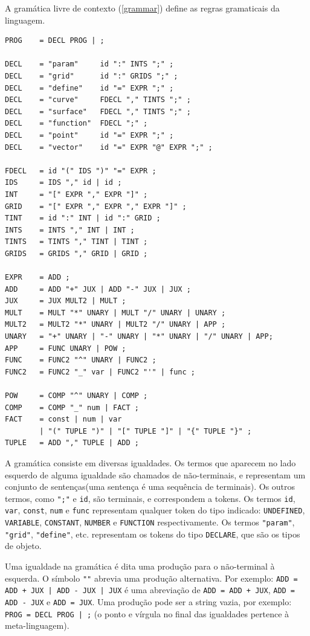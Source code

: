 \newpage
A gramática livre de contexto (\ref{grammar}) define as
regras gramaticais da linguagem.
\begin{lstlisting}[caption=Gramática livre de contexto, label=grammar]
PROG    = DECL PROG | ;

DECL    = "param"     id ":" INTS ";" ;
DECL    = "grid"      id ":" GRIDS ";" ;
DECL    = "define"    id "=" EXPR ";" ;
DECL    = "curve"     FDECL "," TINTS ";" ;
DECL    = "surface"   FDECL "," TINTS ";" ;
DECL    = "function"  FDECL ";" ;
DECL    = "point"     id "=" EXPR ";" ;
DECL    = "vector"    id "=" EXPR "@" EXPR ";" ;

FDECL   = id "(" IDS ")" "=" EXPR ;
IDS     = IDS "," id | id ;
INT     = "[" EXPR "," EXPR "]" ;
GRID    = "[" EXPR "," EXPR "," EXPR "]" ;
TINT    = id ":" INT | id ":" GRID ;
INTS    = INTS "," INT | INT ;
TINTS   = TINTS "," TINT | TINT ;
GRIDS   = GRIDS "," GRID | GRID ;

EXPR    = ADD ;
ADD     = ADD "+" JUX | ADD "-" JUX | JUX ;
JUX     = JUX MULT2 | MULT ;
MULT    = MULT "*" UNARY | MULT "/" UNARY | UNARY ;
MULT2   = MULT2 "*" UNARY | MULT2 "/" UNARY | APP ;
UNARY   = "+" UNARY | "-" UNARY | "*" UNARY | "/" UNARY | APP;
APP     = FUNC UNARY | POW ;
FUNC    = FUNC2 "^" UNARY | FUNC2 ;
FUNC2   = FUNC2 "_" var | FUNC2 "'" | func ;

POW     = COMP "^" UNARY | COMP ;
COMP    = COMP "_" num | FACT ;
FACT    = const | num | var
        | "(" TUPLE ")" | "[" TUPLE "]" | "{" TUPLE "}" ;
TUPLE   = ADD "," TUPLE | ADD ;
\end{lstlisting}

A gramática consiste em diversas igualdades.
Os termos que aparecem no lado esquerdo de alguma igualdade
são chamados de não-terminais,
e representam um conjunto de sentenças(uma sentença é uma sequência de terminais).
Os outros termos, como \texttt{";"} e \texttt{id}, são terminais,
e correspondem a tokens. Os termos \texttt{id}, \texttt{var},
\texttt{const}, \texttt{num}
e \texttt{func} representam qualquer token do tipo indicado:
\texttt{UNDEFINED}, \texttt{VARIABLE}, \texttt{CONSTANT},
\texttt{NUMBER} e \texttt{FUNCTION} respectivamente.
Os termos \texttt{"param"}, \texttt{"grid"}, \texttt{"define"}, etc.
representam os tokens do tipo \texttt{DECLARE}, que são os tipos de objeto.

Uma igualdade na gramática é dita uma produção para o não-terminal à esquerda.
O símbolo \texttt{"\textbar"}  abrevia uma produção alternativa. 
Por exemplo: \texttt{ADD = ADD + JUX | ADD - JUX | JUX}
é uma abreviação de \texttt{ADD = ADD + JUX},
\texttt{ADD = ADD - JUX} e \texttt{ADD = JUX}.
Uma produção pode ser a string vazia, por exemplo: \texttt{PROG = DECL PROG | ;}
(o ponto e vírgula no final das igualdades pertence à meta-linguagem).

